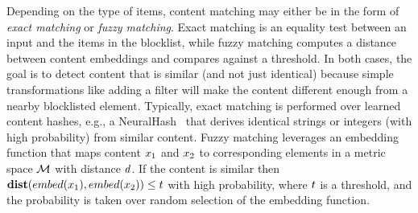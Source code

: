 %
Depending on the type of items, content matching may either be in the form of \emph{exact matching} or \emph{fuzzy matching}. Exact matching is an 
equality test between an input and the items in the blocklist, while fuzzy matching computes a 
distance between content embeddings and compares against a threshold. In both cases, the goal is to 
detect content that is similar (and not just identical) because simple transformations like adding a filter 
will make the content different enough from a nearby blocklisted element. Typically, exact matching is performed over learned content hashes, e.g., a NeuralHash~\cite{apple2021csam} that derives identical strings or integers (with high probability) from similar content. Fuzzy matching leverages an embedding function  that maps content $\genericSetElmt[1]$ and 
$\genericSetElmt[2]$ to corresponding elements in a metric space 
$\metricSpace$ with distance $\distance$. If the content is similar then 
$\distanceNotation[\distance][\contentHash(\genericSetElmt[1])][\contentHash(\genericSetElmt[2])] 
\le \threshold$ with high 
probability, where $t$ is a threshold, and the probability is taken over random selection of the embedding function. 
%
%

 

